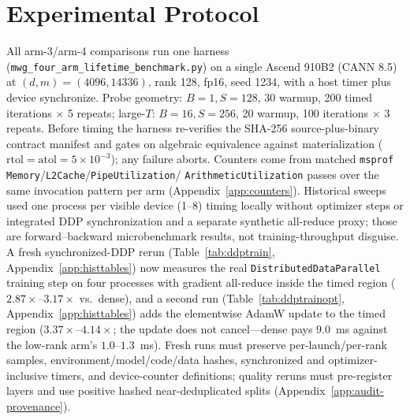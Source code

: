 \section{Experimental Protocol}
\label{sec:protocol}

All arm-3/arm-4 comparisons run one harness
(\texttt{mwg\_four\_arm\_lifetime\_benchmark.py}) on a single Ascend 910B2
(CANN 8.5) at $(d,m)=(4096,14336)$, rank 128, fp16, seed 1234, with a host
timer plus device synchronize. Probe geometry: $B{=}1,S{=}128$, 30 warmup,
200 timed iterations $\times$ 5 repeats; large-$T$: $B{=}16,S{=}256$, 20
warmup, 100 iterations $\times$ 3 repeats. Before timing the harness
re-verifies the SHA-256 source-plus-binary contract manifest and gates on
algebraic equivalence against materialization ($\mathrm{rtol}=\mathrm{atol}
=5\times10^{-3}$); any failure aborts. Counters come from matched
\texttt{msprof} \texttt{Memory}/\texttt{L2Cache}/\texttt{PipeUtilization}/
\texttt{ArithmeticUtilization} passes over the same invocation pattern per
arm (Appendix~\ref{app:counters}). Historical sweeps used one process per
visible device (1--8) timing locally without optimizer steps or integrated
DDP synchronization and a separate synthetic all-reduce proxy; those are
forward--backward microbenchmark results, not training-throughput disguise.
A fresh synchronized-DDP rerun (Table~\ref{tab:ddptrain},
Appendix~\ref{app:histtables}) now measures the real
\texttt{DistributedDataParallel} training step on four processes with gradient
all-reduce inside the timed region ($2.87\times$--$3.17\times$ vs.\ dense),
and a second run (Table~\ref{tab:ddptrainopt}, Appendix~\ref{app:histtables})
adds the elementwise AdamW update to the timed region
($3.37\times$--$4.14\times$; the update does not cancel---dense pays $9.0$~ms
against the low-rank arm's $1.0$--$1.3$~ms). Fresh
runs must preserve per-launch/per-rank samples, environment/model/code/data
hashes, synchronized and optimizer-inclusive timers, and device-counter
definitions; quality reruns must pre-register layers and use positive hashed
near-deduplicated splits (Appendix~\ref{app:audit-provenance}).
